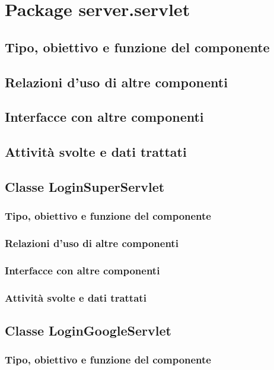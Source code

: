 \newpage
\section{Package server.servlet} %
\subsection*{Tipo, obiettivo e funzione del componente}
\subsection*{Relazioni d'uso di altre componenti}
\subsection*{Interfacce con altre componenti}
\subsection*{Attivit\`a svolte e dati trattati}

\subsection{Classe LoginSuperServlet}
\subsubsection*{Tipo, obiettivo e funzione del componente}
\subsubsection*{Relazioni d'uso di altre componenti}
\subsubsection*{Interfacce con altre componenti}
\subsubsection*{Attivit\`a svolte e dati trattati}

\subsection{Classe LoginGoogleServlet}
\subsubsection*{Tipo, obiettivo e funzione del componente}
